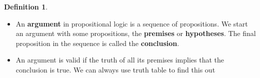 \documentclass{article}
\theoremstyle{definition}
\newtheorem*{defi}{Definition}
\theoremstyle{definition}
\theoremstyle{named}
\begin{document}
\begin{defi}
    \begin{itemize}
        \item An \textbf{argument} in propositional logic is a sequence of
propositions. We start an argument with some
propositions, the \textbf{premises} or \textbf{hypotheses}. The final
proposition in the sequence is called the \textbf{conclusion}.

        \item An argument is valid if the truth of all its premises
implies that the conclusion is true. We can always use truth table to find this out
    \end{itemize}   
\end{defi}

\end{document}
